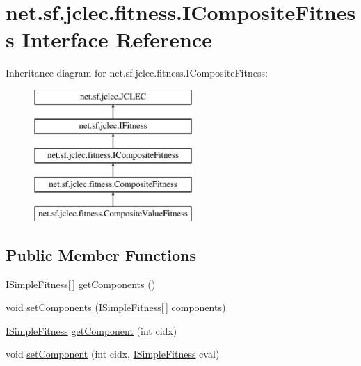 \hypertarget{interfacenet_1_1sf_1_1jclec_1_1fitness_1_1_i_composite_fitness}{\section{net.\-sf.\-jclec.\-fitness.\-I\-Composite\-Fitness Interface Reference}
\label{interfacenet_1_1sf_1_1jclec_1_1fitness_1_1_i_composite_fitness}
}
Inheritance diagram for net.\-sf.\-jclec.\-fitness.\-I\-Composite\-Fitness\-:\begin{figure}[H]
\begin{center}
\leavevmode
\includegraphics[height=5.000000cm]{interfacenet_1_1sf_1_1jclec_1_1fitness_1_1_i_composite_fitness}
\end{center}
\end{figure}
\subsection*{Public Member Functions}
\begin{DoxyCompactItemize}
\item 
\hyperlink{interfacenet_1_1sf_1_1jclec_1_1fitness_1_1_i_simple_fitness}{I\-Simple\-Fitness}\mbox{[}$\,$\mbox{]} \hyperlink{interfacenet_1_1sf_1_1jclec_1_1fitness_1_1_i_composite_fitness_aa5028f84af2e42e98747990a1818a3f5}{get\-Components} ()
\item 
void \hyperlink{interfacenet_1_1sf_1_1jclec_1_1fitness_1_1_i_composite_fitness_a4e0df445defe2719606810e62be2ef26}{set\-Components} (\hyperlink{interfacenet_1_1sf_1_1jclec_1_1fitness_1_1_i_simple_fitness}{I\-Simple\-Fitness}\mbox{[}$\,$\mbox{]} components)
\item 
\hyperlink{interfacenet_1_1sf_1_1jclec_1_1fitness_1_1_i_simple_fitness}{I\-Simple\-Fitness} \hyperlink{interfacenet_1_1sf_1_1jclec_1_1fitness_1_1_i_composite_fitness_a7a90bfd8df1d05ed16153e647a9f1d99}{get\-Component} (int cidx)
\item 
void \hyperlink{interfacenet_1_1sf_1_1jclec_1_1fitness_1_1_i_composite_fitness_a681e21343657e866148af83709ae85b8}{set\-Component} (int cidx, \hyperlink{interfacenet_1_1sf_1_1jclec_1_1fitness_1_1_i_simple_fitness}{I\-Simple\-Fitness} cval)
\end{DoxyCompactItemize}


